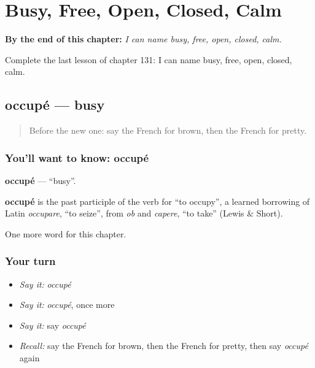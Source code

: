 
\chapter{Busy, Free, Open, Closed, Calm}
\label{ch:fr-busy-free-open-closed-calm}

\begin{chapteropening}
\textbf{By the end of this chapter:} \emph{I can name busy, free, open, closed, calm.}

Complete the last lesson of chapter 131: I can name busy, free, open, closed, calm.
\end{chapteropening}

\section[occupé]{occupé — busy}

\label{lesson:FR-C131-occupe}



\begin{quote}
Before the new one: say the French for brown, then the French for pretty.
\end{quote}

\subsection*{You'll want to know: occupé}
\textbf{occupé} — \textquotedblleft{}busy\textquotedblright{}.

\begin{cousinweb}
\textbf{occupé} is the past participle of the verb for \textquotedblleft{}to occupy\textquotedblright{}, a learned borrowing of Latin \emph{occupare}, \textquotedblleft{}to seize\textquotedblright{}, from \emph{ob} and \emph{capere}, \textquotedblleft{}to take\textquotedblright{} (Lewis \& Short).
\end{cousinweb}

\begin{grammarlens}[title={What you've built}]
One more word for this chapter.
\end{grammarlens}

\subsection*{Your turn}
\begin{itemize}
\raggedright
  \item \emph{Say it:} \emph{occupé}
  \item \emph{Say it:} \emph{occupé}, once more
  \item \emph{Say it:} say \emph{occupé}
  \item \emph{Recall:} say the French for brown, then the French for pretty, then say \emph{occupé} again
\end{itemize}

